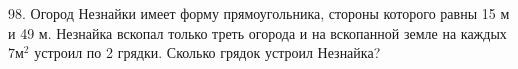 98. Огород Незнайки имеет форму прямоугольника, стороны которого равны 15 м и 49 м. Незнайка вскопал только треть огорода и на вскопанной земле на каждых
$7\text{м}^2$ устроил по 2 грядки. Сколько грядок устроил Незнайка?\\
